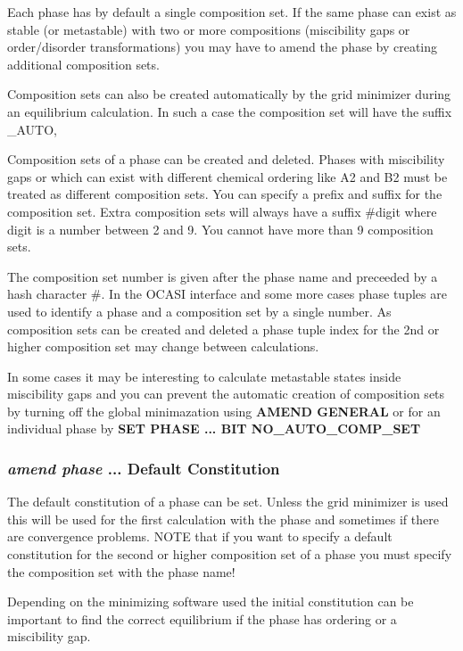 \documentclass[11pt]{article}
\begin{document}
Each phase has by default a single composition set.  If the same phase
can exist as stable (or metastable) with two or more compositions
(miscibility gaps or order/disorder transformations) you may have to
amend the phase by creating additional composition sets.  

Composition sets can also be created automatically by the grid
minimizer during an equilibrium calculation.  In such a case the
composition set will have the suffix \_AUTO,

Composition sets of a phase can be created and deleted.  Phases with
miscibility gaps or which can exist with different chemical ordering
like A2 and B2 must be treated as different composition sets.  You can
specify a prefix and suffix for the composition set.  Extra
composition sets will always have a suffix \#digit where digit is a
number between 2 and 9.  You cannot have more than 9 composition sets.

The composition set number is given after the phase name and preceeded
by a hash character \#.  In the OCASI interface and some more cases
phase tuples are used to identify a phase and a composition set by a
single number.  As composition sets can be created and deleted a phase
tuple index for the 2nd or higher composition set may change between
calculations.

In some cases it may be interesting to calculate metastable states
inside miscibility gaps and you can prevent the automatic creation of
composition sets by turning off the global minimazation using {\bf
  AMEND GENERAL} or for an individual phase by {\bf SET PHASE ... BIT
  NO\_AUTO\_COMP\_SET}

\hypertarget{Amend phase default constit}{}
\subsubsection{{\em amend phase} ... Default Constitution}

The default constitution of a phase can be set.  Unless the grid
minimizer is used this will be used for the first calculation with the
phase and sometimes if there are convergence problems.  NOTE that if
you want to specify a default constitution for the second or higher
composition set of a phase you must specify the composition set with
the phase name!

Depending on the minimizing software used the initial constitution can
be important to find the correct equilibrium if the phase has ordering
or a miscibility gap.
\end{document}
